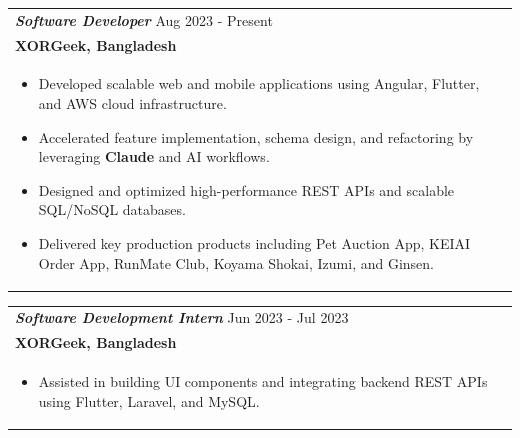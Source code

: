 \documentclass[a4paper,8pt]{article}
\begin{document}
\begin{tabularx}{\linewidth}{ @{}l r@{} }
\color[HTML]{371e77}\textbf{\textit{Software Developer}} \hfill \color[HTML]{371e77} Aug 2023 - Present \\[2pt]
\textbf{{XORGeek, Bangladesh}} \hfill \\[2.5pt]
\begin{minipage}[t]{\linewidth}
\begin{itemize}[nosep,after=\strut, leftmargin=1.5em, itemsep=1.5pt]
\item Developed scalable web and mobile applications using Angular, Flutter, and AWS cloud infrastructure.
\item Accelerated feature implementation, schema design, and refactoring by leveraging \textbf{Claude} and AI workflows.
\item Designed and optimized high-performance REST APIs and scalable SQL/NoSQL databases.
\item Delivered key production products including Pet Auction App, KEIAI Order App, RunMate Club, Koyama Shokai, Izumi, and Ginsen.
\end{itemize}
\end{minipage}
\end{tabularx}

\vspace{2.5pt}

\begin{tabularx}{\linewidth}{ @{}l r@{} }
\color[HTML]{371e77}\textbf{\textit{Software Development Intern}} \hfill \color[HTML]{371e77} Jun 2023 - Jul 2023 \\[2pt]
\textbf{{XORGeek, Bangladesh}} \hfill \\[2.5pt]
\begin{minipage}[t]{\linewidth}
\begin{itemize}[nosep,after=\strut, leftmargin=1.5em, itemsep=1.5pt]
\item Assisted in building UI components and integrating backend REST APIs using Flutter, Laravel, and MySQL.
\end{itemize}
\end{minipage}
\end{tabularx}

\vspace{2.5pt}
\end{document}
